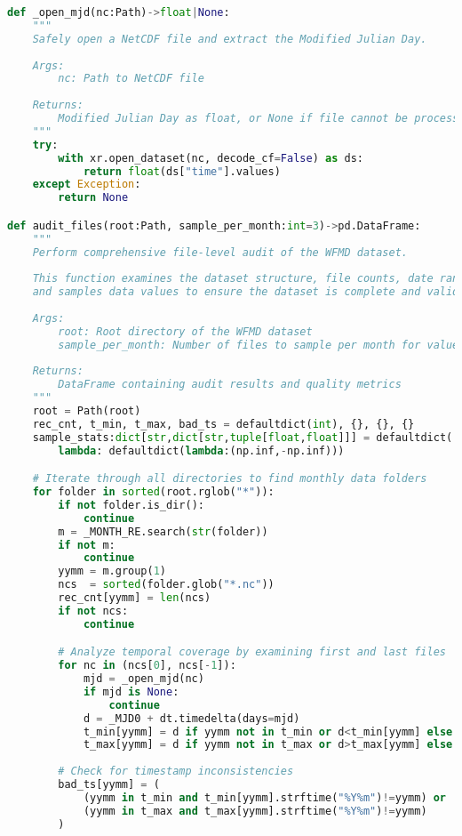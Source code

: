 \begin{lstlisting}[language=Python, caption=Dataset Health Check Algorithm, label=alg:step05_health_check]
def _open_mjd(nc:Path)->float|None:
    """
    Safely open a NetCDF file and extract the Modified Julian Day.
    
    Args:
        nc: Path to NetCDF file
        
    Returns:
        Modified Julian Day as float, or None if file cannot be processed
    """
    try:
        with xr.open_dataset(nc, decode_cf=False) as ds:
            return float(ds["time"].values)
    except Exception:
        return None

def audit_files(root:Path, sample_per_month:int=3)->pd.DataFrame:
    """
    Perform comprehensive file-level audit of the WFMD dataset.
    
    This function examines the dataset structure, file counts, date ranges,
    and samples data values to ensure the dataset is complete and valid.
    
    Args:
        root: Root directory of the WFMD dataset
        sample_per_month: Number of files to sample per month for value ranges
        
    Returns:
        DataFrame containing audit results and quality metrics
    """
    root = Path(root)
    rec_cnt, t_min, t_max, bad_ts = defaultdict(int), {}, {}, {}
    sample_stats:dict[str,dict[str,tuple[float,float]]] = defaultdict(
        lambda: defaultdict(lambda:(np.inf,-np.inf)))

    # Iterate through all directories to find monthly data folders
    for folder in sorted(root.rglob("*")):
        if not folder.is_dir(): 
            continue
        m = _MONTH_RE.search(str(folder))
        if not m: 
            continue
        yymm = m.group(1)
        ncs  = sorted(folder.glob("*.nc"))
        rec_cnt[yymm] = len(ncs)
        if not ncs:
            continue

        # Analyze temporal coverage by examining first and last files
        for nc in (ncs[0], ncs[-1]):
            mjd = _open_mjd(nc)
            if mjd is None:
                continue
            d = _MJD0 + dt.timedelta(days=mjd)
            t_min[yymm] = d if yymm not in t_min or d<t_min[yymm] else t_min[yymm]
            t_max[yymm] = d if yymm not in t_max or d>t_max[yymm] else t_max[yymm]
        
        # Check for timestamp inconsistencies
        bad_ts[yymm] = (
            (yymm in t_min and t_min[yymm].strftime("%Y%m")!=yymm) or
            (yymm in t_max and t_max[yymm].strftime("%Y%m")!=yymm)
        )


\end{lstlisting}
